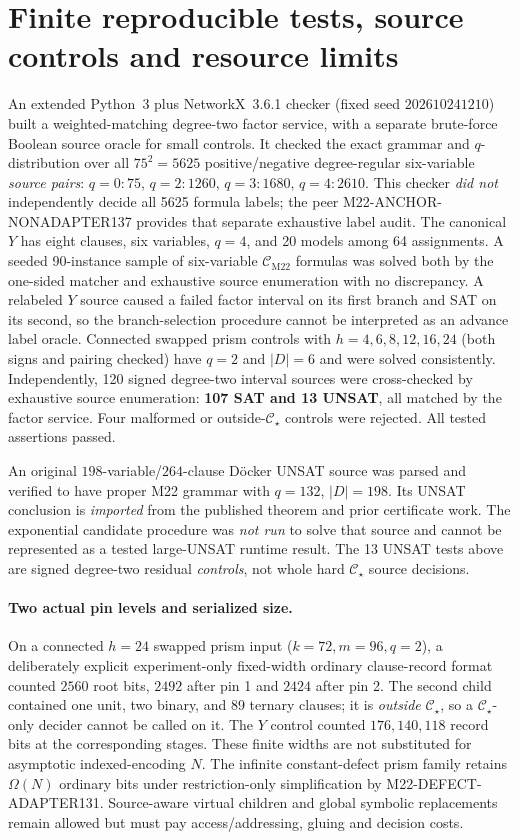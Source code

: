 \documentclass[11pt]{article}
\newcommand{\CM}{\mathcal C_{\mathrm{M22}}}
\newcommand{\CS}{\mathcal C_{\star}}
\begin{document}
\section{Finite reproducible tests, source controls and resource limits}
An extended Python~3 plus NetworkX~3.6.1 checker (fixed seed $202610241210$) built a weighted-matching degree-two factor service, with a separate brute-force Boolean source oracle for small controls. It checked the exact grammar and $q$-distribution over all $75^2=5625$ positive/negative degree-regular six-variable \emph{source pairs}: $q=0:75$, $q=2:1260$, $q=3:1680$, $q=4:2610$. This checker \emph{did not} independently decide all 5625 formula labels; the peer M22-ANCHOR-NONADAPTER137 provides that separate exhaustive label audit. The canonical $Y$ has eight clauses, six variables, $q=4$, and 20 models among 64 assignments. A seeded 90-instance sample of six-variable $\CM$ formulas was solved both by the one-sided matcher and exhaustive source enumeration with no discrepancy. A relabeled $Y$ source caused a failed factor interval on its first branch and SAT on its second, so the branch-selection procedure cannot be interpreted as an advance label oracle. Connected swapped prism controls with $h=4,6,8,12,16,24$ (both signs and pairing checked) have $q=2$ and $|D|=6$ and were solved consistently. Independently, 120 signed degree-two interval sources were cross-checked by exhaustive source enumeration: \textbf{107 SAT and 13 UNSAT}, all matched by the factor service. Four malformed or outside-$\CS$ controls were rejected. All tested assertions passed.

An original $198$-variable/$264$-clause D\"ocker UNSAT source was parsed and verified to have proper M22 grammar with $q=132$, $|D|=198$. Its UNSAT conclusion is \emph{imported} from the published theorem and prior certificate work. The exponential candidate procedure was \emph{not run} to solve that source and cannot be represented as a tested large-UNSAT runtime result. The 13 UNSAT tests above are signed degree-two residual \emph{controls}, not whole hard $\CS$ source decisions.

\paragraph{Two actual pin levels and serialized size.}
On a connected $h=24$ swapped prism input ($k=72,m=96,q=2$), a deliberately explicit experiment-only fixed-width ordinary clause-record format counted $2560$ root bits, $2492$ after pin 1 and $2424$ after pin 2. The second child contained one unit, two binary, and 89 ternary clauses; it is \emph{outside} $\CS$, so a $\CS$-only decider cannot be called on it. The $Y$ control counted $176,140,118$ record bits at the corresponding stages. These finite widths are not substituted for asymptotic indexed-encoding $N$. The infinite constant-defect prism family retains $\Omega(N)$ ordinary bits under restriction-only simplification by M22-DEFECT-ADAPTER131. Source-aware virtual children and global symbolic replacements remain allowed but must pay access/addressing, gluing and decision costs.
\end{document}
